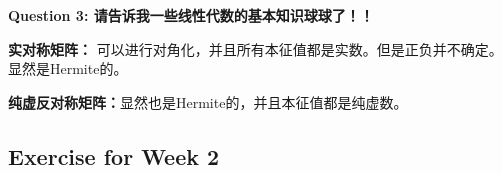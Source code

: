 \textbf{Question 3: 请告诉我一些线性代数的基本知识球球了！！}

\textbf{实对称矩阵：} 可以进行对角化，并且所有本征值都是实数。但是正负并不确定。显然是Hermite的。

\textbf{纯虚反对称矩阵：}显然也是Hermite的，并且本征值都是纯虚数。



\subsection{Exercise for Week 2}
